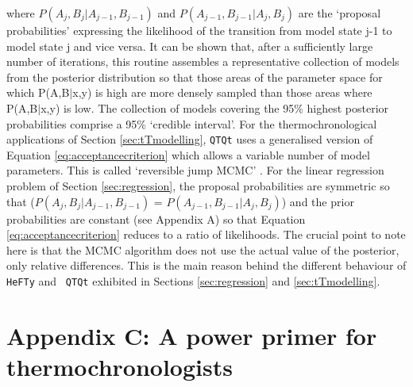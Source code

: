 \documentclass{article}
\begin{document}
where $P(A_j,B_j|A_{j-1},B_{j-1})$ and
$P(A_{j-1},B_{j-1}|A_{j},B_{j})$ are the `proposal probabilities'
expressing the likelihood of the transition from model state j-1 to
model state j and vice versa.  It can be shown that, after a
sufficiently large number of iterations, this routine assembles a
representative collection of models from the posterior distribution so
that those areas of the parameter space for which P(A,B$|$x,y) is high
are more densely sampled than those areas where P(A,B$|$x,y) is
low. The collection of models covering the 95\% highest posterior
probabilities comprise a 95\% `credible interval'.  For the
thermochronological applications of Section \ref{sec:tTmodelling},
{\tt QTQt} uses a generalised version of Equation
\ref{eq:acceptancecriterion} which allows a variable number of model
parameters. This is called `reversible jump MCMC'
\cite{green1995}. For the linear regression problem of Section
\ref{sec:regression}, the proposal probabilities are symmetric so that
($P(A_j,B_j|A_{j-1},B_{j-1})$ = $P(A_{j-1},B_{j-1}|A_{j},B_{j})$) and
the prior probabilities are constant (see Appendix A) so that Equation
\ref{eq:acceptancecriterion} reduces to a ratio of likelihoods.  The
crucial point to note here is that the MCMC algorithm does not use the
actual value of the posterior, only relative differences.  This is the
main reason behind the different behaviour of {\tt HeFTy} and {\tt
  QTQt} exhibited in Sections \ref{sec:regression} and
\ref{sec:tTmodelling}.

\section*{Appendix C: A power primer for thermochronologists}
\end{document}

